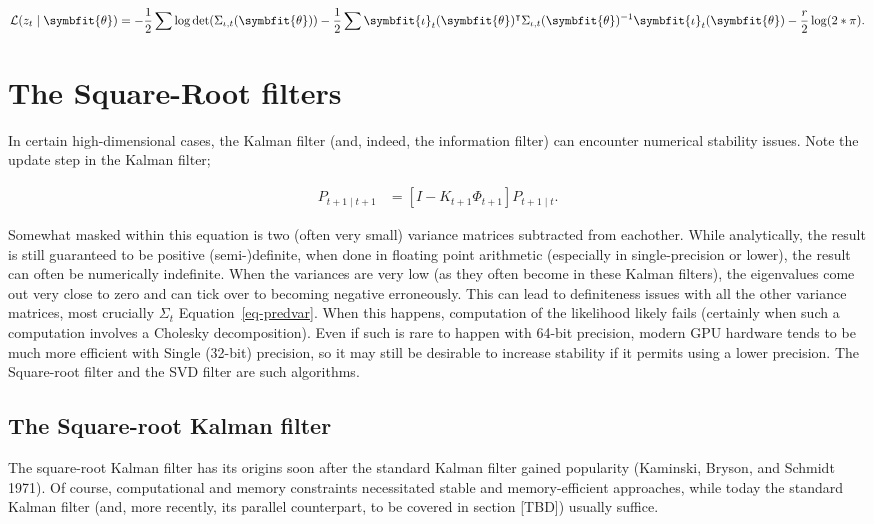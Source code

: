 \documentclass[
]{report}
\newcommand{\bv}[1]{\symbfit{#1}}
\theoremstyle{plain}
\theoremstyle{plain}
\theoremstyle{remark}
\begin{document}
\[\begin{split}
\mathcal L(z_t\mid\bv\theta) = -\frac12\sum \log\det(\Sigma_{\iota, t}(\bv\theta)) - \frac12 \sum\bv \iota_t(\bv\theta)^\intercal\Sigma_{\iota, t}(\bv\theta)^{-1} \bv \iota_t(\bv\theta) - \frac{r}{2}\log(2*\pi).
\end{split}
\]

\section{The Square-Root filters}\label{the-square-root-filters}

In certain high-dimensional cases, the Kalman filter (and, indeed, the
information filter) can encounter numerical stability issues. Note the
update step in the Kalman filter;

\[\begin{split}
P_{t+1\mid t+1} &= [I- K_{t+1}\Phi_{t+1}]P_{t+1\mid t}.
\end{split}
\]

Somewhat masked within this equation is two (often very small) variance
matrices subtracted from eachother. While analytically, the result is
still guaranteed to be positive (semi-)definite, when done in floating
point arithmetic (especially in single-precision or lower), the result
can often be numerically indefinite. When the variances are very low (as
they often become in these Kalman filters), the eigenvalues come out
very close to zero and can tick over to becoming negative erroneously.
This can lead to definiteness issues with all the other variance
matrices, most crucially \(\Sigma_t\) Equation~\ref{eq-predvar}. When
this happens, computation of the likelihood likely fails (certainly when
such a computation involves a Cholesky decomposition). Even if such is
rare to happen with 64-bit precision, modern GPU hardware tends to be
much more efficient with Single (32-bit) precision, so it may still be
desirable to increase stability if it permits using a lower precision.
The Square-root filter and the SVD filter are such algorithms.

\subsection{The Square-root Kalman
filter}\label{the-square-root-kalman-filter}

The square-root Kalman filter has its origins soon after the standard
Kalman filter gained popularity (Kaminski, Bryson, and Schmidt 1971). Of
course, computational and memory constraints necessitated stable and
memory-efficient approaches, while today the standard Kalman filter
(and, more recently, its parallel counterpart, to be covered in section
{[}TBD{]}) usually suffice.
\end{document}
